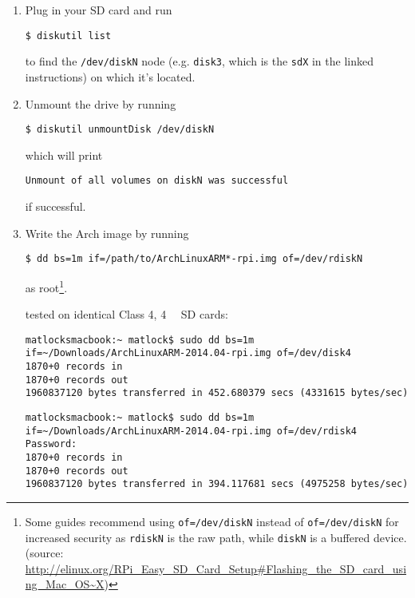 \documentclass[12pt,letterpaper]{article}
\begin{document}
\begin{enumerate}
\item Plug in your SD card and run

\begin{lstlisting}
$ diskutil list
\end{lstlisting}

to find the \lstinline{/dev/diskN} node (e.g. \lstinline{disk3}, which is the \lstinline{sdX} in the linked instructions) on which it's located.

\item Unmount the drive by running

\begin{lstlisting}
$ diskutil unmountDisk /dev/diskN
\end{lstlisting}

which will print

\begin{lstlisting}
Unmount of all volumes on diskN was successful
\end{lstlisting}

if successful.

\item Write the Arch image by running

\begin{lstlisting}
$ dd bs=1m if=/path/to/ArchLinuxARM*-rpi.img of=/dev/rdiskN
\end{lstlisting}
as root\footnote{Some guides recommend using \lstinline{of=/dev/diskN} instead of \lstinline{of=/dev/diskN} for increased security as \lstinline{rdiskN} is the raw path, while \lstinline{diskN} is a buffered device. (source: %
\url{http://elinux.org/RPi_Easy_SD_Card_Setup\#Flashing_the_SD_card_using_Mac_OS~X}) }. %

tested on identical Class 4, \SI{4}{\giga\byte} SD cards:
\begin{lstlisting}
matlocksmacbook:~ matlock$ sudo dd bs=1m if=~/Downloads/ArchLinuxARM-2014.04-rpi.img of=/dev/disk4
1870+0 records in
1870+0 records out
1960837120 bytes transferred in 452.680379 secs (4331615 bytes/sec)
\end{lstlisting}

\begin{lstlisting}
matlocksmacbook:~ matlock$ sudo dd bs=1m if=~/Downloads/ArchLinuxARM-2014.04-rpi.img of=/dev/rdisk4
Password:
1870+0 records in
1870+0 records out
1960837120 bytes transferred in 394.117681 secs (4975258 bytes/sec)
\end{lstlisting}

\end{enumerate}
\end{document}
